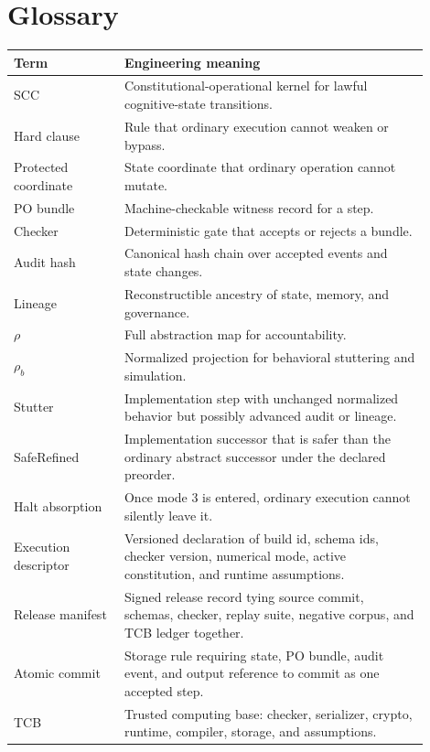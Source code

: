 \documentclass[11pt,oneside]{article}
\begin{document}
\section{Glossary}
\begin{longtable}{@{}p{0.24\linewidth}p{0.66\linewidth}@{}}
\toprule
\textbf{Term} & \textbf{Engineering meaning} \\
\midrule
SCC & Constitutional-operational kernel for lawful cognitive-state transitions. \\
Hard clause & Rule that ordinary execution cannot weaken or bypass. \\
Protected coordinate & State coordinate that ordinary operation cannot mutate. \\
PO bundle & Machine-checkable witness record for a step. \\
Checker & Deterministic gate that accepts or rejects a bundle. \\
Audit hash & Canonical hash chain over accepted events and state changes. \\
Lineage & Reconstructible ancestry of state, memory, and governance. \\
\(\rho\) & Full abstraction map for accountability. \\
\(\rho_b\) & Normalized projection for behavioral stuttering and simulation. \\
Stutter & Implementation step with unchanged normalized behavior but possibly advanced audit or lineage. \\
SafeRefined & Implementation successor that is safer than the ordinary abstract successor under the declared preorder. \\
Halt absorption & Once mode 3 is entered, ordinary execution cannot silently leave it. \\
Execution descriptor & Versioned declaration of build id, schema ids, checker version, numerical mode, active constitution, and runtime assumptions. \\
Release manifest & Signed release record tying source commit, schemas, checker, replay suite, negative corpus, and TCB ledger together. \\
Atomic commit & Storage rule requiring state, PO bundle, audit event, and output reference to commit as one accepted step. \\
TCB & Trusted computing base: checker, serializer, crypto, runtime, compiler, storage, and assumptions. \\
\bottomrule
\end{longtable}
\end{document}
